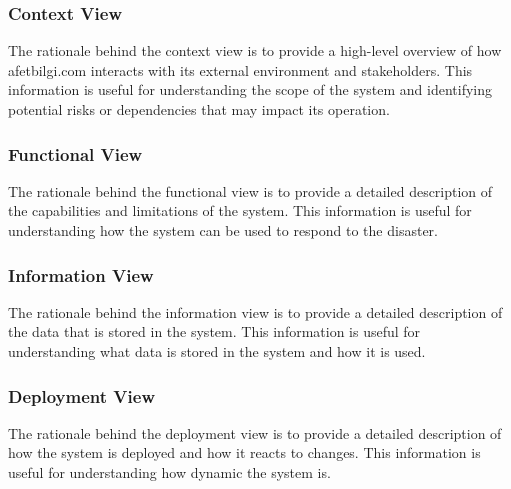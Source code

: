 \documentclass[a4paper]{article}
\begin{document}
    \subsubsection{Context View}
    The rationale behind the context view is to provide a high-level overview of how afetbilgi.com interacts with its external
    environment and stakeholders. This information is useful for understanding the scope of the system and identifying potential
    risks or dependencies that may impact its operation.
    \subsubsection{Functional View}
    The rationale behind the functional view is to provide a detailed description of the capabilities and limitations of the
    system. This information is useful for understanding how the system can be used to respond to the disaster.
    \subsubsection{Information View}
    The rationale behind the information view is to provide a detailed description of the data that is stored in the system.
    This information is useful for understanding what data is stored in the system and how it is used.
    \subsubsection{Deployment View}
    The rationale behind the deployment view is to provide a detailed description of how the system is deployed and how it reacts
    to changes. This information is useful for understanding how dynamic the system is.
\end{document}
